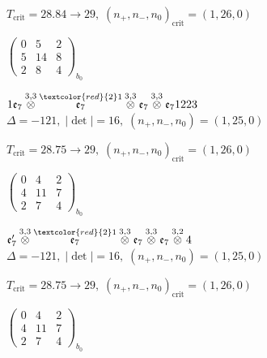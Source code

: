 \documentclass[10pt]{article}
\begin{document}
\hspace{1em}$T_{\text{crit}}=28.84 \to 29,\; (n_+,n_-,n_0)_{\text{crit}}=(1,26,0)$

\hspace{2em}$\left(\begin{smallmatrix}0 & 5 & 2 \\ 5 & 14 & 8 \\ 2 & 8 & 4\end{smallmatrix}\right)_{\!b_0}$

\smallskip

$1\mathfrak{e}_7\overset{3,3}{\otimes}\overset{\textcolor{red}{2}1}{\mathfrak{e}_7}\overset{3,3}{\otimes}\mathfrak{e}_7\overset{3,3}{\otimes}\mathfrak{e}_71223$ \quad $\Delta=-121,\; |\det|=16,\; (n_+,n_-,n_0)=(1,25,0)$

\hspace{1em}$T_{\text{crit}}=28.75 \to 29,\; (n_+,n_-,n_0)_{\text{crit}}=(1,26,0)$

\hspace{2em}$\left(\begin{smallmatrix}0 & 4 & 2 \\ 4 & 11 & 7 \\ 2 & 7 & 4\end{smallmatrix}\right)_{\!b_0}$

\smallskip

$\mathfrak{e}_7'\overset{3,3}{\otimes}\overset{\textcolor{red}{2}1}{\mathfrak{e}_7}\overset{3,3}{\otimes}\mathfrak{e}_7\overset{3,3}{\otimes}\mathfrak{e}_7\overset{3,2}{\otimes}4$ \quad $\Delta=-121,\; |\det|=16,\; (n_+,n_-,n_0)=(1,25,0)$

\hspace{1em}$T_{\text{crit}}=28.75 \to 29,\; (n_+,n_-,n_0)_{\text{crit}}=(1,26,0)$

\hspace{2em}$\left(\begin{smallmatrix}0 & 4 & 2 \\ 4 & 11 & 7 \\ 2 & 7 & 4\end{smallmatrix}\right)_{\!b_0}$

\smallskip
\end{document}
